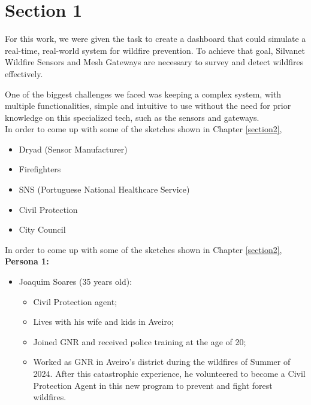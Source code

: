 \chapter{Section 1} \label{section1}
For this work, we were given the task to create a dashboard 
that could simulate a real-time, real-world system for wildfire 
prevention. To achieve
that goal, Silvanet Wildfire Sensors and Mesh Gateways are necessary to
survey and detect wildfires effectively. \par 
One of the biggest challenges we faced was keeping a complex system, with multiple functionalities, simple
and intuitive to use without the need for prior knowledge on this
specialized tech, such as the sensors and gateways. \\
In order to come up with some of the sketches shown in Chapter 
\ref{section2}, 
\begin{itemize}
    \item Dryad (Sensor Manufacturer)
    \item Firefighters
    \item SNS (Portuguese National Healthcare Service)
    \item Civil Protection
    \item City Council
\end{itemize} \par 
In order to come up with some of the sketches shown in Chapter \ref{section2},
 \\

\textbf{Persona 1:}
\begin{itemize}
    \item Joaquim Soares (35 years old):
    \begin{itemize}
    \item Civil Protection agent;
    \item Lives with his wife and kids in Aveiro;
    \item Joined GNR and received police training at the age of 20;
    \item Worked as GNR in Aveiro's district during the wildfires of 
    Summer of 2024. 
    After this catastrophic experience, he volunteered to become a
    Civil Protection Agent in this new program to prevent and fight forest wildfires. 
    \end{itemize}
\end{itemize} 

